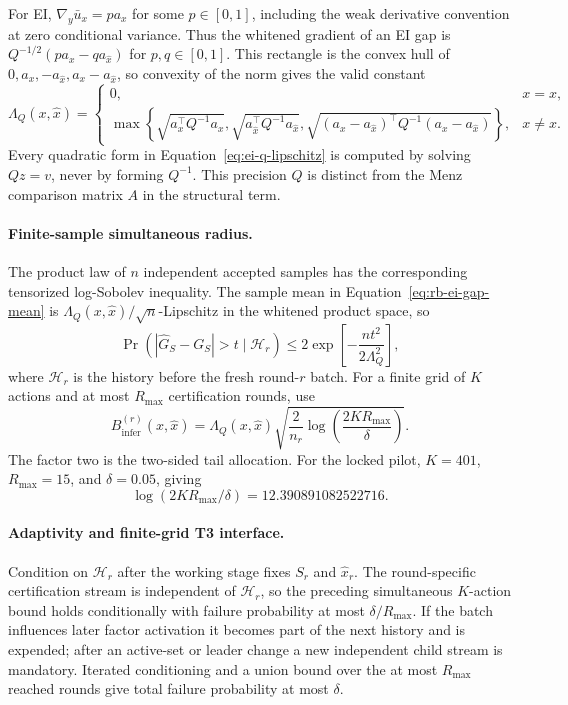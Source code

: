 For EI, $\nabla_y\bar u_x=p a_x$ for some $p\in[0,1]$, including the weak
derivative convention at zero conditional variance.  Thus the whitened
gradient of an EI gap is $Q^{-1/2}(p a_x-q a_{\widehat x})$ for
$p,q\in[0,1]$.  This rectangle is the convex hull of
$0,a_x,-a_{\widehat x},a_x-a_{\widehat x}$, so convexity of the norm gives the
valid constant
\begin{equation}
\Lambda_Q(x,\widehat x)=
\begin{cases}
0, & x=\widehat x,\\
\max\!\left\{
\sqrt{a_x^\top Q^{-1}a_x},
\sqrt{a_{\widehat x}^\top Q^{-1}a_{\widehat x}},
\sqrt{(a_x-a_{\widehat x})^\top Q^{-1}(a_x-a_{\widehat x})}
\right\}, & x\ne\widehat x.
\end{cases}
\label{eq:ei-q-lipschitz}
\end{equation}
Every quadratic form in Equation~\eqref{eq:ei-q-lipschitz} is computed by
solving $Qz=v$, never by forming $Q^{-1}$.  This precision $Q$ is distinct from
the Menz comparison matrix $A$ in the structural term.

\paragraph{Finite-sample simultaneous radius.}
The product law of $n$ independent accepted samples has the corresponding
tensorized log-Sobolev inequality.  The sample mean in
Equation~\eqref{eq:rb-ei-gap-mean} is
$\Lambda_Q(x,\widehat x)/\sqrt n$-Lipschitz in the whitened product space, so
\[
  \Pr\!\left(
  |\widehat G_S-G_S|>t\mid\mathcal H_r
  \right)
  \le2\exp\!\left[-\frac{nt^2}{2\Lambda_Q^2}\right],
\]
where $\mathcal H_r$ is the history before the fresh round-$r$ batch.  For a
finite grid of $K$ actions and at most $R_{\max}$ certification rounds, use
\begin{equation}
  B_{\mathrm{infer}}^{(r)}(x,\widehat x)
  =\Lambda_Q(x,\widehat x)
   \sqrt{\frac{2}{n_r}
   \log\!\left(\frac{2KR_{\max}}{\delta}\right)}.
  \label{eq:finite-sample-inference-radius}
\end{equation}
The factor two is the two-sided tail allocation.  For the locked pilot,
$K=401$, $R_{\max}=15$, and $\delta=0.05$, giving
\[
  \log(2KR_{\max}/\delta)=12.390891082522716.
\]

\paragraph{Adaptivity and finite-grid T3 interface.}
Condition on $\mathcal H_r$ after the working stage fixes $S_r$ and
$\widehat x_r$.  The round-specific certification stream is independent of
$\mathcal H_r$, so the preceding simultaneous $K$-action bound holds
conditionally with failure probability at most $\delta/R_{\max}$.  If the
batch influences later factor activation it becomes part of the next history
and is expended; after an active-set or leader change a new independent child
stream is mandatory.  Iterated conditioning and a union bound over the at most
$R_{\max}$ reached rounds give total failure probability at most $\delta$.


